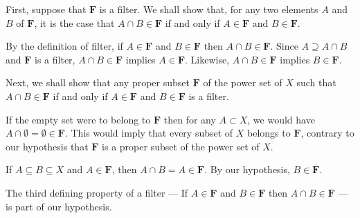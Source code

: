 \documentclass[12pt]{article}
\begin{document}
First, suppose that $\mathbf{F}$ is a filter.  We shall show that, for
any two elements $A$ and $B$ of $\mathbf{F}$, it is the case that $A
\cap B \in \mathbf{F}$ if and only if $A \in \mathbf{F}$ and $B \in
\mathbf{F}$.

By the definition of filter, if $A \in \mathbf{F}$ and $B \in
\mathbf{F}$ then $A \cap B \in \mathbf{F}$.  Since $A \supseteq A \cap
B$ and $\mathbf{F}$ is a filter, $A \cap B \in \mathbf{F}$ implies $A
\in \mathbf{F}$.  Likewise, $A \cap B \in \mathbf{F}$ implies $B \in
\mathbf{F}$.

Next, we shall show that any proper subset $\mathbf{F}$ of the power
set of $X$ such that $A \cap B \in \mathbf{F}$ if and only if $A \in
\mathbf{F}$ and $B \in \mathbf{F}$ is a filter.

If the empty set were to belong to $\mathbf{F}$ then for any $A
\subset X$, we would have $A \cap \emptyset = \emptyset \in
\mathbf{F}$.  This would imply that every subset of $X$ belongs to
$\mathbf{F}$, contrary to our hypothesis that $\mathbf{F}$ is a proper
subset of the power set of $X$.

If $A \subseteq B \subseteq X$ and $A \in \mathbf{F}$, then $A \cap B
= A \in \mathbf{F}$.  By our hypothesis, $B \in \mathbf{F}$.

The third defining property of a filter --- If $A \in \mathbf{F}$ and
$B \in \mathbf{F}$ then $A \cap B \in \mathbf{F}$ --- is part of our
hypothesis.
\end{document}

